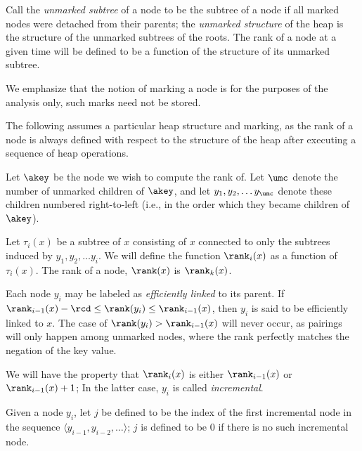 Call the \emph{unmarked subtree} of a node to be the subtree of a node if all marked nodes were detached from their parents; the \emph{unmarked structure} of the heap is the structure of the unmarked subtrees of the roots. The rank of a node at a given time will be defined to be a function of the structure of its unmarked subtree.
\begin{fullonly}
 We emphasize that the notion of marking a node is for the purposes of the analysis only, such marks need not be stored.
\end{fullonly}

The following assumes a particular heap structure and marking, as the rank of a node is always defined with respect to the structure of the heap after executing a sequence of heap operations. 
\begin{fullonly}

\end{fullonly}
Let $\akey$ be the node we wish to compute the rank of. Let $\umc$ denote the number of unmarked children of $\akey$, and let $y_1,y_2,\ldots y_{\umc}$ denote these children numbered right-to-left (i.e., in the order which they became children of $\akey$).
\begin{fullonly}

\end{fullonly}
Let $\tau_i(x)$ be a subtree of $x$ consisting of $x$ connected to only the subtrees induced by $y_1, y_2, \ldots y_i$. We will define the function $\rank_i(x)$ as a function of $\tau_i(x)$. The rank of a  node, $\rank(x)$ is $\rank_k(x)$. 
\begin{fullonly}

\end{fullonly}
Each node $y_i$ may be labeled as \emph{efficiently linked} to its parent.
If $ \rank_{i-1}(x)-\rcd \leq \rank(y_i) \leq \rank_{i-1}(x)$, then $y_i$ is said to be efficiently linked to $x$. The case of $ \rank(y_i) > \rank_{i-1}(x)$ will never occur, as pairings will only happen among unmarked nodes, where the rank perfectly matches the negation of the key value.
\begin{fullonly}

\end{fullonly}
We will have the property that $\rank_i(x)$ is either $\rank_{i-1}(x)$ or $\rank_{i-1}(x)+1$; In the latter case, $y_i$ is called \emph{incremental}. 
\begin{fullonly}

\end{fullonly}
Given a node $y_i$, let $j$ be defined to be the index of the first incremental node in the sequence $\langle y_{i-1}, y_{i-2}, \ldots\rangle$; $j$ is defined to be 0 if there is no such incremental node.
